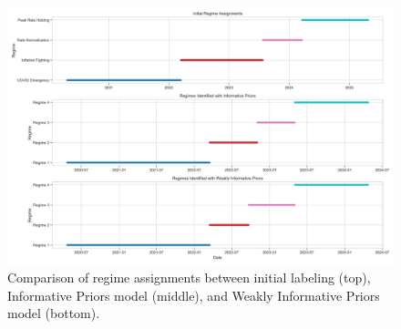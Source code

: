 \begin{figure}[htbp]
    \centering
    \includegraphics[width=\textwidth]{figure9_model_comparison_regimes.jpg}
    \caption{Comparison of regime assignments between initial labeling (top), Informative Priors model (middle), and Weakly Informative Priors model (bottom).}
    \label{fig:comparison_regimes}
\end{figure}
        